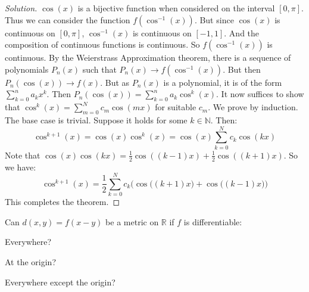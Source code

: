 \documentclass[crop=false,class=article,oneside]{standalone}
\begin{document}
        \begin{proof}[Solution]
            $\cos(x)$ is a bijective function when considered on
            the interval $[0,\pi]$. Thus we can consider the
            function $f(\cos^{-1}(x))$. But since $\cos(x)$ is
            continuous on $[0,\pi]$, $\cos^{-1}(x)$ is
            continuous on $[-1,1]$. And the composition of
            continuous functions is continuous. So
            $f(\cos^{-1}(x))$ is continuous. By the
            Weierstrass Approximation theorem, there is a
            sequence of polynomials $P_{n}(x)$ such that
            $P_{n}(x)\rightarrow{f(\cos^{-1}(x))}$. But then
            $P_{n}(\cos(x))\rightarrow{f(x)}$. But as $P_{n}(x)$
            is a polynomial, it is of the form
            $\sum_{k=0}^{n}a_{k}x^{k}$. Then
            $P_{n}(\cos(x))=\sum_{k=0}^{n}a_{k}\cos^{k}(x)$. It
            now suffices to show that
            $\cos^{k}(x)=\sum_{m=0}^{N}c_{m}\cos(mx)$ for
            suitable $c_{m}$. We prove by induction. The base case
            is trivial. Suppose it holds for some $k\in\mathbb{N}$.
            Then:
            \begin{equation*}
                \cos^{k+1}(x)=\cos(x)\cos^{k}(x)
                =\cos(x)\sum_{k=0}^{N}c_{k}\cos(kx)
            \end{equation*}
            Note that
            $\cos(x)\cos(kx)%
             =\frac{1}{2}\cos((k-1)x)+\frac{1}{2}\cos((k+1)x)$.
            So we have:
            \begin{equation*}
                \cos^{k+1}(x)
                =\frac{1}{2}\sum_{k=0}^{N}c_{k}
                \bigg(
                    \cos\Big((k+1)x\Big)+\cos\Big((k-1)x\Big)
                \bigg)
            \end{equation*}
            This completes the theorem.
        \end{proof}
        \begin{problem}
            Can $d(x,y)=f(x-y)$ be a metric on $\mathbb{R}$
            if $f$ is differentiable:
            \begin{enumerate}
                \begin{multicols}{3}
                    \item Everywhere?
                    \item At the origin?
                    \item Everywhere except the origin?
                \end{multicols}
            \end{enumerate}
        \end{problem}
\end{document}
